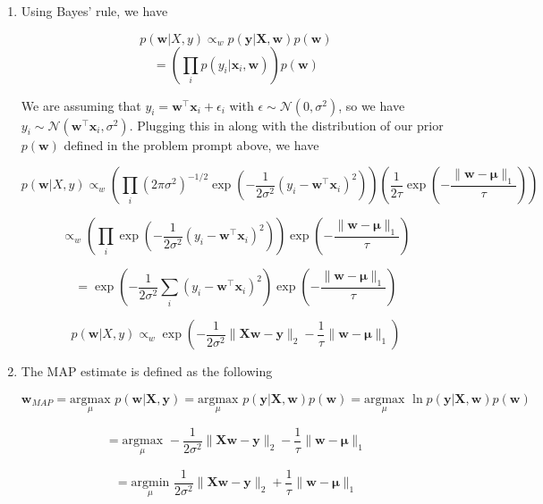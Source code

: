 \documentclass[submit]{harvardml}
\begin{document}
\begin{enumerate}

\item 

Using Bayes' rule, we have 

$$p(\mathbf{w}|X,y) \propto_w p(\mathbf{y}|\mathbf{X},\mathbf{w}) p(\mathbf{w})$$
$$=\left( \prod_i p(y_i|\mathbf{x}_i,\mathbf{w}) \right) p(\mathbf{w})$$

We are assuming that $y_i= \mathbf{w}^\top \mathbf{x}_i + \epsilon_i$ with $\epsilon \sim \mathcal{N}(0, \sigma^2)$,
so we have $y_i\sim \mathcal{N}(\mathbf{w}^\top \mathbf{x}_i, \sigma^2)$. Plugging this in along with the 
distribution of our prior $p(\mathbf{w})$ defined in the problem prompt above, we have

$$p(\mathbf{w}|X,y) \propto_w 
\left(\prod_i (2\pi\sigma^2)^{-1/2}\exp\left(-\frac{1}{2\sigma^2}(y_i-\mathbf{w}^\top \mathbf{x}_i)^2\right) \right)
\left(\frac{1}{2\tau} \exp\left(-\frac{\|\mathbf{w}-\mathbf{\mu}\|_1}{\tau}\right)\right)$$

$$ \propto_w  \left(\prod_i \exp\left(-\frac{1}{2\sigma^2}(y_i-\mathbf{w}^\top \mathbf{x}_i)^2\right)\right) \exp\left(-\frac{\|\mathbf{w}-\mathbf{\mu}\|_1}{\tau}\right)$$

$$ = \exp\left(-\frac{1}{2\sigma^2}\sum_i(y_i-\mathbf{w}^\top \mathbf{x}_i)^2\right) \exp\left(-\frac{\|\mathbf{w}-\mathbf{\mu}\|_1}{\tau}\right)$$

$$ p(\mathbf{w}|X,y)\propto_w \exp\left(-\frac{1}{2\sigma^2}\|\mathbf{Xw}-\mathbf{y}\|_2 -\frac{1}{\tau}\|\mathbf{w}-\mathbf{\mu}\|_1\right)$$

\item 

The MAP estimate is defined as the following

$$\mathbf{w}_{MAP} = \underset{\mu}{\mathrm{argmax}} \,\, p(\mathbf{w}|\mathbf{X},\mathbf{y})= \underset{\mu}{\mathrm{argmax}} \,\, p(\mathbf{y}|\mathbf{X},\mathbf{w})p(\mathbf{w})= \underset{\mu}{\mathrm{argmax}} \,\, \ln p(\mathbf{y}|\mathbf{X},\mathbf{w})p(\mathbf{w})$$

$$= \underset{\mu}{\mathrm{argmax}} \,\, -\frac{1}{2\sigma^2}\|\mathbf{Xw}-\mathbf{y}\|_2 -\frac{1}{\tau}\|\mathbf{w}-\mathbf{\mu}\|_1$$

$$= \underset{\mu}{\mathrm{argmin}} \,\, \frac{1}{2\sigma^2}\|\mathbf{Xw}-\mathbf{y}\|_2 +\frac{1}{\tau}\|\mathbf{w}-\mathbf{\mu}\|_1$$


\end{enumerate}
\end{document}
